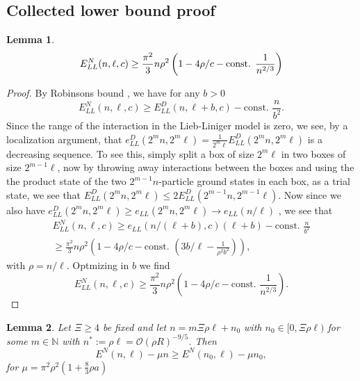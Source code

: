 \documentclass[a4paper,11pt]{article}
\newtheorem{lemma}{Lemma}
\numberwithin{equation}{section}
\begin{document}
	\subsection{Collected lower bound proof}
		\begin{lemma}\label{LemmaLiebLinigerNeumannLowerBound}
		\begin{equation}
		E_{LL}^{N}(n,\ell,c)\geq \frac{\pi^2}{3}n\rho^2\left(1-4\rho/c-\textnormal{const. }\frac{1}{n^{2/3}}\right)
		\end{equation}
	\end{lemma}
	\begin{proof}
		By Robinsons bound \cite{robinson2014thermodynamic}, we have for any $ b>0 $ \begin{equation}
		E_{LL}^{N}(n,\ell,c)\geq E_{LL}^D(n,\ell+b,c)-\text{const. }\frac{n}{b^2}.
		\end{equation}
		Since the range of the interaction in the Lieb-Liniger model is zero, we see, by a localization argument, that $ e^D_{LL}(2^mn,2^m\ell)=\frac{1}{2^m\ell}E_{LL}^{D}(2^mn,2^m\ell) $ is a decreasing sequence. To see this, simply split a box of size $ 2^m\ell $ in two boxes of size $ 2^{m-1}\ell $, now by throwing away interactions between the boxes and using the the product state of the two $ 2^{m-1}n $-particle ground states in each box, as a trial state, we see that $ E^D_{LL}(2^{m}n,2^m\ell)\leq 2E^D_{LL}(2^{m-1}n,2^{m-1}\ell)  $. Now since we also have $ e^D_{LL}(2^mn,2^m\ell)\geq e_{LL}(2^mn,2^m\ell)\to e_{LL}(n/\ell) $ \cite{PhysRev.130.1605}, we see that \begin{equation}
		\begin{aligned}
		E_{LL}^{N}(n,\ell,c)\geq e_{LL}(n/(\ell+b),c)(\ell+b)-\text{const. }\frac{n}{b^2}\\\geq \frac{\pi^2}{3}n\rho^2\left(1-4\rho/c-\text{const. }\left(3b/\ell-\frac{1}{\rho^2b^2}\right)\right),
		\end{aligned}
		\end{equation}
		with $ \rho=n/\ell $. Optmizing in $ b $ we find \begin{equation}
		E_{LL}^{N}(n,\ell,c)\geq \frac{\pi^2}{3}n\rho^2\left(1-4\rho/c-\text{const. }\frac{1}{n^{2/3}}\right).
		\end{equation}
	\end{proof}
	\begin{lemma}\label{LemmaLocalizationFbound}
		Let $ \Xi\geq 4 $ be fixed and let $ n=m\Xi \rho \ell+n_0 $ with $ n_0\in[0,\Xi\rho \ell) $ for some $ m\in\mathbb{N} $ with $ n^{\ast}:=\rho\ell=\mathcal{O}(\rho R)^{-9/5} $. Then \begin{equation}
		E^{N}(n,\ell)-\mu n \geq E^{N}(n_0,\ell)-\mu n_0,
		\end{equation}
		for $ \mu=\pi^2\rho^2\left(1+\frac{8}{3}\rho a\right) $
	\end{lemma}
\end{document}
